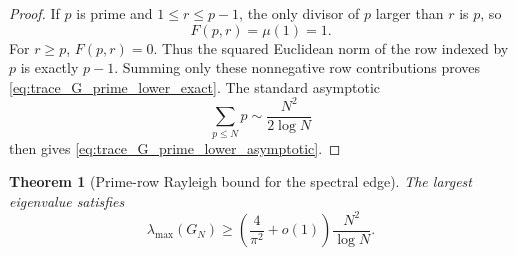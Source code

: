 \documentclass[11pt]{amsart}
\numberwithin{equation}{section}
\theoremstyle{plain}
\newtheorem{theorem}{Theorem}[section]
\theoremstyle{definition}
\theoremstyle{remark}
\newcommand{\mob}{\mu}
\begin{document}
\begin{proof}
If $p$ is prime and $1\le r\le p-1$, the only divisor of $p$ larger than $r$ is $p$, so
\begin{equation}
F(p,r)=\mob(1)=1.
\end{equation}
For $r\ge p$, $F(p,r)=0$.  Thus the squared Euclidean norm of the row indexed by $p$ is exactly $p-1$.  Summing only these nonnegative row contributions proves \eqref{eq:trace_G_prime_lower_exact}.  The standard asymptotic
\begin{equation}
\sum_{p\le N}p\sim\frac{N^2}{2\log N}
\end{equation}
then gives \eqref{eq:trace_G_prime_lower_asymptotic}.
\end{proof}

\begin{theorem}[Prime-row Rayleigh bound for the spectral edge]
\label{thm:prime_rayleigh_edge}
The largest eigenvalue satisfies
\begin{equation}
\lambda_{\max}(G_N)
\ge
\left(\frac{4}{\pi^2}+o(1)\right)\frac{N^2}{\log N}.
\label{eq:lambda_max_prime_rayleigh}
\end{equation}
\end{theorem}
\end{document}
